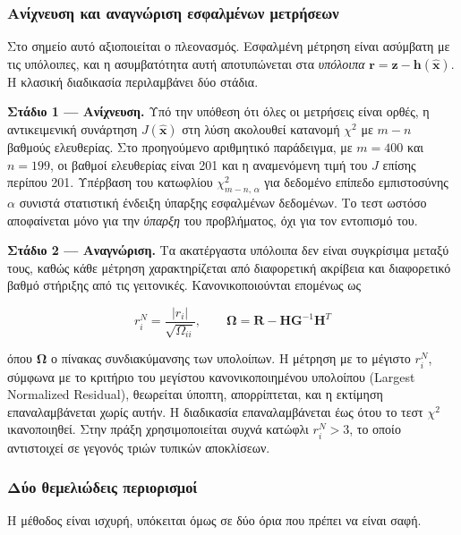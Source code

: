 \subsubsection*{Ανίχνευση και αναγνώριση εσφαλμένων μετρήσεων}

Στο σημείο αυτό αξιοποιείται ο πλεονασμός. Εσφαλμένη μέτρηση είναι ασύμβατη με τις
υπόλοιπες, και η ασυμβατότητα αυτή αποτυπώνεται στα \emph{υπόλοιπα}
$\mathbf{r} = \mathbf{z}-\mathbf{h}(\hat{\mathbf{x}})$. Η κλασική διαδικασία περιλαμβάνει
δύο στάδια.

\textbf{Στάδιο 1 --- Ανίχνευση.} Υπό την υπόθεση ότι όλες οι μετρήσεις είναι ορθές, η
αντικειμενική συνάρτηση $J(\hat{\mathbf{x}})$ στη λύση ακολουθεί κατανομή $\chi^2$ με
$m-n$ βαθμούς ελευθερίας. Στο προηγούμενο αριθμητικό παράδειγμα, με $m = 400$ και
$n = 199$, οι βαθμοί ελευθερίας είναι 201 και η αναμενόμενη τιμή του $J$ επίσης περίπου
201. Υπέρβαση του κατωφλίου $\chi^2_{m-n,\,\alpha}$ για δεδομένο επίπεδο εμπιστοσύνης
$\alpha$ συνιστά στατιστική ένδειξη ύπαρξης εσφαλμένων δεδομένων. Το τεστ ωστόσο
αποφαίνεται μόνο για την \emph{ύπαρξη} του προβλήματος, όχι για τον εντοπισμό του.

\textbf{Στάδιο 2 --- Αναγνώριση.} Τα ακατέργαστα υπόλοιπα δεν είναι συγκρίσιμα μεταξύ τους,
καθώς κάθε μέτρηση χαρακτηρίζεται από διαφορετική ακρίβεια και διαφορετικό βαθμό στήριξης
από τις γειτονικές. Κανονικοποιούνται επομένως ως

\begin{equation}
r_i^{N} = \frac{|r_i|}{\sqrt{\Omega_{ii}}}, \qquad
\boldsymbol{\Omega} = \mathbf{R} - \mathbf{H}\mathbf{G}^{-1}\mathbf{H}^{T}
\label{eq:normres}
\end{equation}

όπου $\boldsymbol{\Omega}$ ο πίνακας συνδιακύμανσης των υπολοίπων. Η μέτρηση με το μέγιστο
$r_i^{N}$, σύμφωνα με το κριτήριο του μεγίστου κανονικοποιημένου υπολοίπου (Largest
Normalized Residual), θεωρείται ύποπτη, απορρίπτεται, και η εκτίμηση επαναλαμβάνεται χωρίς
αυτήν. Η διαδικασία επαναλαμβάνεται έως ότου το τεστ $\chi^2$ ικανοποιηθεί. Στην πράξη
χρησιμοποιείται συχνά κατώφλι $r_i^{N} > 3$, το οποίο αντιστοιχεί σε γεγονός τριών τυπικών
αποκλίσεων.

\subsubsection*{Δύο θεμελιώδεις περιορισμοί}

Η μέθοδος είναι ισχυρή, υπόκειται όμως σε δύο όρια που πρέπει να είναι σαφή.

